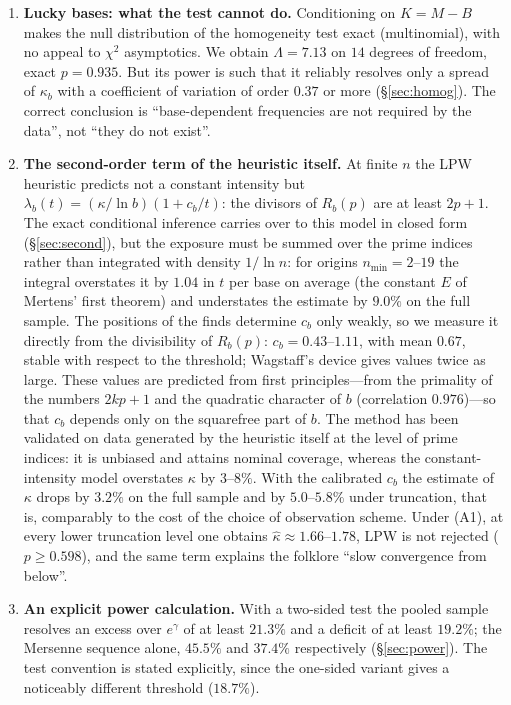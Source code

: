 \documentclass[11pt,a4paper]{article}
\theoremstyle{plain}
\theoremstyle{remark}
\newcommand{\Rb}{R_b}
\newcommand{\eg}{e^{\gamma}}
\begin{document}
\begin{enumerate}
\item\textbf{Lucky bases: what the test cannot do.} Conditioning on $K=M-B$
makes the null distribution of the homogeneity test exact (multinomial), with
no appeal to $\chi^2$ asymptotics. We obtain $\Lambda=7.13$ on $14$ degrees of
freedom, exact $p=0.935$. But its power is such that it reliably resolves only
a spread of $\kappa_b$ with a coefficient of variation of order $0.37$ or more
(\S\ref{sec:homog}). The correct conclusion is
``base-dependent frequencies are not required by the data'', not ``they do not
exist''.

\item\textbf{The second-order term of the heuristic itself.} At finite $n$ the
LPW heuristic predicts not a constant intensity but
$\lambda_b(t)=(\kappa/\ln b)(1+c_b/t)$: the divisors of $\Rb(p)$ are at least
$2p+1$. The exact conditional inference carries over to this model in closed
form (\S\ref{sec:second}), but the exposure must be summed over the prime indices
rather than integrated with density $1/\ln n$: for origins $n_{\min}=2$--$19$ the
integral overstates it by $1.04$ in $t$ per base on average (the constant $E$ of
Mertens' first theorem) and understates the estimate by $9.0\%$ on the full
sample. The positions of the finds determine $c_b$ only weakly, so
we measure it directly from the divisibility of $\Rb(p)$: $c_b=0.43$--$1.11$,
with mean $0.67$, stable with respect to the threshold; Wagstaff's device gives
values twice as large. These values are predicted from first principles---from
the primality of the numbers $2kp+1$ and the quadratic character of $b$
(correlation $0.976$)---so that $c_b$ depends only on the squarefree part of
$b$. The method has been validated on data generated by the heuristic itself at
the level of prime indices: it is unbiased and attains nominal coverage, whereas
the constant-intensity model overstates $\kappa$ by $3$--$8\%$. With the
calibrated $c_b$ the estimate of $\kappa$ drops by $3.2\%$ on the full sample and
by $5.0$--$5.8\%$ under truncation, that is, comparably to the cost of the
choice of observation scheme. Under (A1), at every lower truncation level one
obtains
$\hat\kappa\approx1.66$--$1.78$, LPW is not rejected ($p\ge0.598$), and the
same term explains the folklore ``slow convergence from below''.

\item\textbf{An explicit power calculation.} With a two-sided test the pooled
sample resolves an excess over $\eg$ of at least $21.3\%$ and a deficit of at
least $19.2\%$; the Mersenne sequence alone, $45.5\%$ and $37.4\%$ respectively
(\S\ref{sec:power}). The test convention is
stated explicitly, since the one-sided variant gives a noticeably different
threshold ($18.7\%$).
\end{enumerate}
\end{document}
